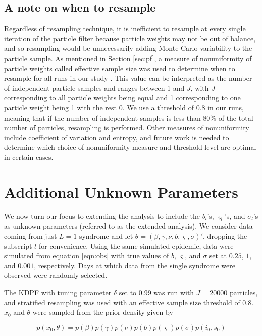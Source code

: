 \documentclass{elsarticle}
\begin{document}
\subsection{A note on when to resample}

Regardless of resampling technique, it is inefficient to resample at every single iteration of the particle filter because particle weights may not be out of balance, and so resampling would be unnecessarily adding Monte Carlo variability to the particle sample.  As mentioned in Section \ref{sec:pf}, a measure of nonuniformity of particle weights called effective sample size was used to determine when to resample for all runs in our study \citep{Liu:Chen:Wong:reje:1998}.  This value can be interpreted as the number of independent particle samples and ranges between 1 and $J$, with $J$ corresponding to all particle weights being equal and 1 corresponding to one particle weight being 1 with the rest 0.  We use a threshold of 0.8 in our runs, meaning that if the number of independent samples is less than 80\% of the total number of particles, resampling is performed.  Other measures of nonuniformity include coefficient of variation and entropy, and future work is needed to determine which choice of nonuniformity measure and threshold level are optimal in certain cases.

\section{Additional Unknown Parameters \label{sec:extend}}

We now turn our focus to extending the analysis to include the $b_l$'s, $\varsigma_l$'s, and $\sigma_l$'s as unknown parameters (referred to as the extended analysis).  We consider data coming from just $L = 1$ syndrome and let $\theta = (\beta, \gamma, \nu, b, \varsigma, \sigma)'$, dropping the subscript $l$ for convenience.  Using the same simulated epidemic, data were simulated from equation \eqref{eqn:obs} with true values of $b$, $\varsigma$, and $\sigma$ set at $0.25$, $1$, and $0.001$, respectively.  Days at which data from the single syndrome were observed were randomly selected.

The KDPF with tuning parameter $\delta$ set to 0.99 was run with $J = 20000$ particles, and stratified resampling was used with an effective sample size threshold of 0.8.  $x_0$ and $\theta$ were sampled from the prior density given by

\[p\left(x_0,\theta\right) = p\left(\beta\right)p\left(\gamma\right)p\left(\nu\right)p\left(b\right)p\left(\varsigma\right)p\left(\sigma\right)p\left(i_0,s_0\right)\]
\end{document}
